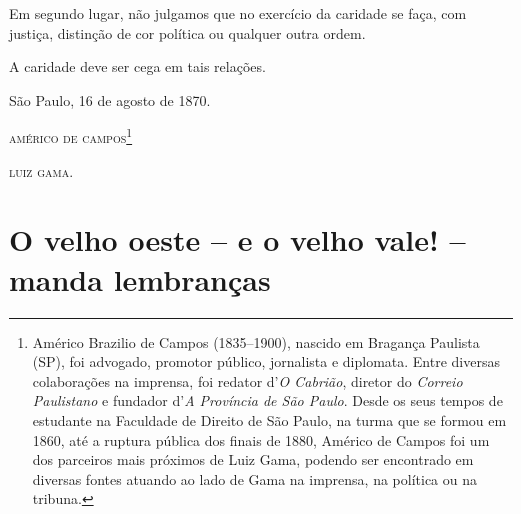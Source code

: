{Em segundo lugar, não julgamos que no exercício da caridade se faça, com
justiça, distinção de cor política ou qualquer outra ordem.

A caridade deve ser cega em tais relações.
\begin{flushright}
São Paulo, 16 de agosto de 1870.

\textsc{américo de campos}\footnote{ Américo Brazilio de Campos (1835--1900),
  nascido em Bragança Paulista (SP), foi advogado, promotor público,
  jornalista e diplomata. Entre diversas colaborações na imprensa, foi
  redator d'\emph{O Cabrião}, diretor do \emph{Correio Paulistano} e
  fundador d'\emph{A Província de São Paulo}. Desde os seus tempos de
  estudante na Faculdade de Direito de São Paulo, na turma que se formou
  em 1860, até a ruptura pública dos finais de 1880, Américo de Campos
  foi um dos parceiros mais próximos de Luiz Gama, podendo ser
  encontrado em diversas fontes atuando ao lado de Gama na imprensa, na
  política ou na tribuna.}

\textsc{luiz gama}.
\end{flushright}
\part{O velho oeste -- e o velho vale! -- manda lembranças}

}
